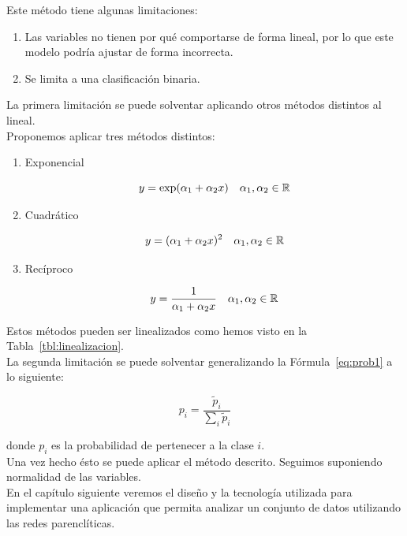 Este método tiene algunas limitaciones:

\begin{enumerate}
	\item Las variables no tienen por qué comportarse de forma lineal, por lo que este modelo podría ajustar de forma incorrecta.
	\item Se limita a una clasificación binaria. 
\end{enumerate}

La primera limitación se puede solventar aplicando otros métodos distintos al lineal.\\

Proponemos aplicar tres métodos distintos:

\begin{enumerate}
	\item Exponencial
	
	\begin{equation}
	y = \exp(\alpha_1 + \alpha_2 x) \quad \alpha_1, \alpha_2 \in \mathbb{R}
	\end{equation}
	
	\item Cuadrático
	
	\begin{equation}
	y = (\alpha_1 + \alpha_2 x)^2 \quad \alpha_1, \alpha_2 \in \mathbb{R}
	\end{equation}
	
	\item Recíproco
	
	\begin{equation}
	y = \dfrac{1}{\alpha_1 + \alpha_2 x} \quad \alpha_1, \alpha_2 \in \mathbb{R}
	\end{equation}
\end{enumerate}

Estos métodos pueden ser linealizados como hemos visto en la Tabla~\ref{tbl:linealizacion}.\\

La segunda limitación se puede solventar generalizando la Fórmula~\ref{eq:prob1} a lo siguiente:

\begin{equation}
p_i = \dfrac{\tilde{p}_i}{\displaystyle \sum_{i} \tilde{p}_i }
\end{equation}

donde ${p}_i$ es la probabilidad de pertenecer a la clase $i$.\\

Una vez hecho ésto se puede aplicar el método descrito. Seguimos suponiendo normalidad de las variables.\\

En el capítulo siguiente veremos el diseño y la tecnología utilizada para implementar una aplicación que permita analizar un conjunto de datos utilizando las redes parenclíticas.